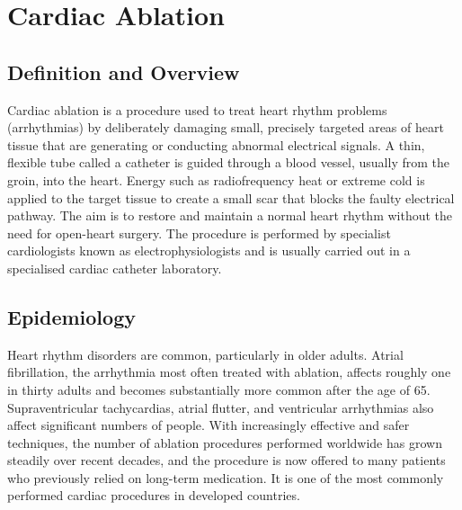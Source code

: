\chapter{Cardiac Ablation}

\section*{Definition and Overview}
Cardiac ablation is a procedure used to treat heart rhythm problems (arrhythmias) by deliberately damaging small, precisely targeted areas of heart tissue that are generating or conducting abnormal electrical signals. A thin, flexible tube called a catheter is guided through a blood vessel, usually from the groin, into the heart. Energy such as radiofrequency heat or extreme cold is applied to the target tissue to create a small scar that blocks the faulty electrical pathway. The aim is to restore and maintain a normal heart rhythm without the need for open-heart surgery. The procedure is performed by specialist cardiologists known as electrophysiologists and is usually carried out in a specialised cardiac catheter laboratory.

\section*{Epidemiology}
Heart rhythm disorders are common, particularly in older adults. Atrial fibrillation, the arrhythmia most often treated with ablation, affects roughly one in thirty adults and becomes substantially more common after the age of 65. Supraventricular tachycardias, atrial flutter, and ventricular arrhythmias also affect significant numbers of people. With increasingly effective and safer techniques, the number of ablation procedures performed worldwide has grown steadily over recent decades, and the procedure is now offered to many patients who previously relied on long-term medication. It is one of the most commonly performed cardiac procedures in developed countries.

